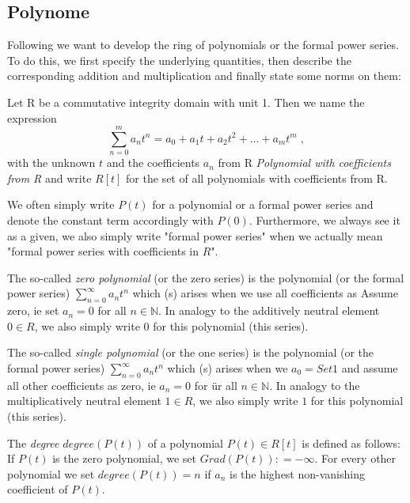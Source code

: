 \subsection{Polynome}
Following \cite{LK} we want to develop the ring of polynomials or the formal power series. To do this, we first specify the underlying quantities, then describe the corresponding addition and multiplication and finally state some norms on them:
\begin{definition}[Polynomials]
Let R be a commutative integrity domain with unit 1.
Then we name the expression
\begin{equation}
\sum _{n = 0} ^{m}{a} _{n}{t} ^{n} ={a} _{0} +{a} _{1} t +{a} _{2} t ^ 2 + \dots + a_m t ^ m \;,
\end{equation}
with the unknown $ t $ and the coefficients $ a_n $ from R
\textit{Polynomial with coefficients from R} and write
$ R [t] $ for the set of all polynomials with coefficients from R.
\end{definition}
We often simply write $ P (t) $ for a polynomial or a formal power series and denote the constant term accordingly with $ P (0) $. Furthermore, we always see it as a given, we also simply write "formal power series" when we actually mean "formal power series with coefficients in $ R $".
\begin{example}
\label{def: zero polynomial}
The so-called \textit{zero polynomial} (or the zero series) is the polynomial (or the formal power series) $ \sum_{n = 0} ^ \infty a_n t ^ n $ which (s) arises when we use all coefficients as Assume zero, ie set $ a_n = 0 $ for all $ n \in \mathbb{N} $. In analogy to the additively neutral element $ 0 \in R $, we also simply write $ 0 $ for this polynomial (this series).

The so-called \textit{single polynomial} (or the one series) is the polynomial (or the formal power series) $ \sum_{n = 0} ^ \infty a_n t ^ n $ which (s) arises when we $ a_0 = Set 1 $ and assume all other coefficients as zero, ie $ a_n = 0 $ for \"ur all $ n \in \mathbb{N} $. In analogy to the multiplicatively neutral element $ 1 \in R $, we also simply write $ 1 $ for this polynomial (this series).
\end{example}
\begin{definition}[degree] The \textit{degree} $ degree (P (t)) $ of a polynomial
$ P (t) \in R [t] $ is defined as follows: If $ P (t) $ is the zero polynomial, we set $ Grad (P (t)): = - \infty $. For every other polynomial we set $ degree (P (t)) = n $ if $ a_n $ is the highest non-vanishing coefficient of $ P (t) $.
\end{definition}

